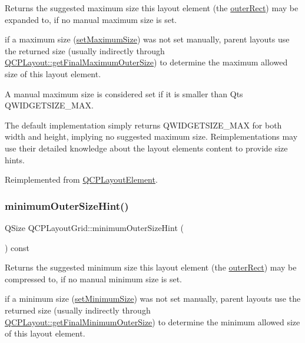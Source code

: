 Returns the suggested maximum size this layout element (the \mbox{\hyperlink{class_q_c_p_layout_element_a2a32a12a6161c9dffbadeb9cc585510c}{outer\+Rect}}) may be expanded to, if no manual maximum size is set.

if a maximum size (\mbox{\hyperlink{class_q_c_p_layout_element_a74eb5280a737ab44833d506db65efd95}{set\+Maximum\+Size}}) was not set manually, parent layouts use the returned size (usually indirectly through \mbox{\hyperlink{class_q_c_p_layout_add49fd6843821a6126914b837ed52e22}{Q\+C\+P\+Layout\+::get\+Final\+Maximum\+Outer\+Size}}) to determine the maximum allowed size of this layout element.

A manual maximum size is considered set if it is smaller than Qt\textquotesingle{}s {\ttfamily Q\+W\+I\+D\+G\+E\+T\+S\+I\+Z\+E\+\_\+\+M\+AX}.

The default implementation simply returns {\ttfamily Q\+W\+I\+D\+G\+E\+T\+S\+I\+Z\+E\+\_\+\+M\+AX} for both width and height, implying no suggested maximum size. Reimplementations may use their detailed knowledge about the layout element\textquotesingle{}s content to provide size hints. 

Reimplemented from \mbox{\hyperlink{class_q_c_p_layout_element_ad96efb977a26e360e8a64a4c1e56456d}{Q\+C\+P\+Layout\+Element}}.

\mbox{\label{class_q_c_p_layout_grid_a0438bc58b4d3894d01db95b08d4268df}} 
\subsubsection{\texorpdfstring{minimumOuterSizeHint()}{minimumOuterSizeHint()}}
{\footnotesize\ttfamily Q\+Size Q\+C\+P\+Layout\+Grid\+::minimum\+Outer\+Size\+Hint (\begin{DoxyParamCaption}{ }\end{DoxyParamCaption}) const\hspace{0.3cm}{\ttfamily [virtual]}}

Returns the suggested minimum size this layout element (the \mbox{\hyperlink{class_q_c_p_layout_element_a2a32a12a6161c9dffbadeb9cc585510c}{outer\+Rect}}) may be compressed to, if no manual minimum size is set.

if a minimum size (\mbox{\hyperlink{class_q_c_p_layout_element_a5dd29a3c8bc88440c97c06b67be7886b}{set\+Minimum\+Size}}) was not set manually, parent layouts use the returned size (usually indirectly through \mbox{\hyperlink{class_q_c_p_layout_a864fddc84721f186663faf3683f1fa70}{Q\+C\+P\+Layout\+::get\+Final\+Minimum\+Outer\+Size}}) to determine the minimum allowed size of this layout element.

